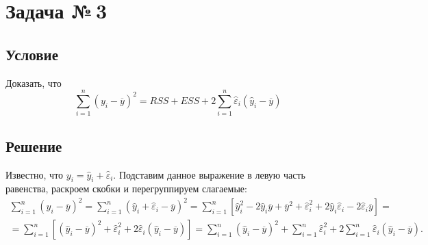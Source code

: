 \documentclass[12pt, a4paper]{article}
\renewcommand{\vec}[1]{\text{\mathversion{bold}${#1}$}}%
\newcommand{\eps}{\varepsilon}
\begin{document}
		
	
	
	\newpage
	\section{Задача №\,3}
	
		\subsection*{Условие}	
		
			Доказать, что 
			$$
				\displaystyle\sum_{i=1}^{n} \left(y_i - \overline{y}\right)^2 = RSS + ESS + 2 \sum_{i=1}^{n} \widehat{\eps}_i (\widehat{y}_i - \overline{y})
			$$
		
		\subsection*{Решение}
		
			Известно, что $y_i = \widehat{y}_i + \widehat{\eps}_i$. Подставим данное выражение в левую часть равенства, раскроем скобки и перегруппируем слагаемые:			
			\begin{multline*}
				\sum_{i=1}^{n} \left(y_i - \overline{y}\right)^2 = 
				\sum_{i=1}^{n} \left(\widehat{y}_i  + \widehat{\eps}_i - \overline{y}\right)^2 = 
				\sum_{i=1}^{n} 
				\left[
				\widehat{y}_i^2  - 2 \widehat{y}_i  \overline{y} + \overline{y}^2
				+  \widehat{\eps}_i^2 + 
				2 \widehat{y}_i  \widehat{\eps}_i - 2 \widehat{\eps}_i  \overline{y}
				\right]
				= \\ =
				\sum_{i=1}^{n} 
				\left[
				(\widehat{y}_i - \overline{y})^2
				+  \widehat{\eps}_i^2 +
				2 \widehat{\eps}_i (\widehat{y}_i  - \overline{y})
				\right] 
				= 
				\sum_{i=1}^{n} (\widehat{y}_i - \overline{y})^2 + 
				\sum_{i=1}^{n} \widehat{\eps}_i^2 +
				2 \sum_{i=1}^{n} \widehat{\eps}_i (\widehat{y}_i  - \overline{y}).
			\end{multline*}
			
			
\end{document}
